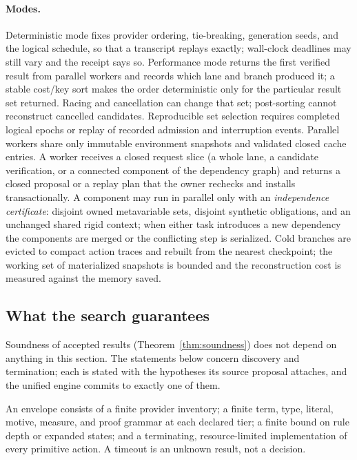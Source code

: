 \paragraph{Modes.} Deterministic mode fixes provider ordering, tie-breaking, generation seeds, and the logical schedule, so that a transcript replays exactly; wall-clock deadlines may still vary and the receipt says so. Performance mode returns the first verified result from parallel workers and records which lane and branch produced it; a stable cost/key sort makes the order deterministic only for the particular result set returned. Racing and cancellation can change that set; post-sorting cannot reconstruct cancelled candidates. Reproducible set selection requires completed logical epochs or replay of recorded admission and interruption events. Parallel workers share only immutable environment snapshots and validated closed cache entries. A worker receives a closed request slice (a whole lane, a candidate verification, or a connected component of the dependency graph) and returns a closed proposal or a replay plan that the owner rechecks and installs transactionally. A component may run in parallel only with an \emph{independence certificate}: disjoint owned metavariable sets, disjoint synthetic obligations, and an unchanged shared rigid context; when either task introduces a new dependency the components are merged or the conflicting step is serialized. Cold branches are evicted to compact action traces and rebuilt from the nearest checkpoint; the working set of materialized snapshots is bounded and the reconstruction cost is measured against the memory saved.

\subsection{What the search guarantees}\label{alg:guarantees}

Soundness of accepted results (Theorem~\ref{thm:soundness}) does not depend on anything in this section. The statements below concern discovery and termination; each is stated with the hypotheses its source proposal attaches, and the unified engine commits to exactly one of them.

\begin{definition}\label{def:envelope}
An envelope consists of a finite provider inventory; a finite term, type, literal, motive, measure, and proof grammar at each declared tier; a finite bound on rule depth or expanded states; and a terminating, resource-limited implementation of every primitive action. A timeout is an unknown result, not a decision.
\end{definition}

